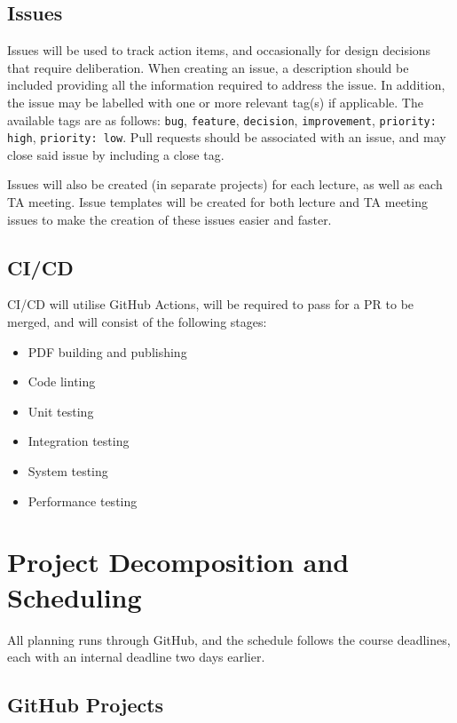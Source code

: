 \documentclass{article}
\begin{document}
\subsection{Issues}

Issues will be used to track action items, and occasionally for design decisions that require
deliberation. When creating an issue, a description should be included providing all the information
required to address the issue. In addition, the issue may be labelled with one or more relevant
tag(s) if applicable. The available tags are as follows: \verb|bug|, \verb|feature|, \verb|decision|,
\verb|improvement|, \verb|priority: high|, \verb|priority: low|. Pull requests should be associated
with an issue, and may close said issue by including a close tag.

\vspace{5mm}

Issues will also be created (in separate projects) for each lecture, as well as each TA meeting.
Issue templates will be created for both lecture and TA meeting issues to make the creation
of these issues easier and faster.

\subsection{CI/CD}

CI/CD will utilise GitHub Actions, will be required to pass for a PR to be merged, and will
consist of the following stages:
\begin{itemize}
	\item PDF building and publishing
	\item Code linting
	\item Unit testing
	\item Integration testing
	\item System testing
	\item Performance testing
\end{itemize}

\section{Project Decomposition and Scheduling}
\label{SecDecomp}

All planning runs through GitHub, and the schedule follows the course
deadlines, each with an internal deadline two days earlier.

\subsection{GitHub Projects}
\end{document}
